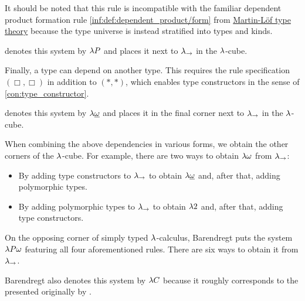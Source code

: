 \begin{definition}
\begin{thmenum}
    It should be noted that this rule is incompatible with the familiar dependent product formation rule \ref{inf:def:dependent_product/form} from \hyperref[def:mltt]{Martin-L\"of type theory} because the type universe is instead stratified into types and kinds.

     denotes this system by \( {\mathrm \lambda} P \) and places it next to \( {\mathrm \lambda}_{\rightarrow} \) in the \( {\mathrm \lambda} \)-cube.

     Finally, a type can depend on another type. This requires the rule specification \( (\Box, \Box) \) in addition to \( (\ast, \ast) \), which enables type constructors in the sense of \cref{con:type_constructor}.

     denotes this system by \( {\mathrm \lambda} \underline \omega \) and places it in the final corner next to \( {\mathrm \lambda}_{\rightarrow} \) in the \( {\mathrm \lambda} \)-cube.

     When combining the above dependencies in various forms, we obtain the other corners of the \( {\mathrm \lambda} \)-cube. For example, there are two ways to obtain \( {\mathrm \lambda} \omega \) from \( {\mathrm \lambda}_{\rightarrow} \):
    \begin{itemize}
      \item By adding type constructors to \( {\mathrm \lambda}_{\rightarrow} \) to obtain \( {\mathrm \lambda} \underline \omega \) and, after that, adding polymorphic types.

      \item By adding polymorphic types to \( {\mathrm \lambda}_{\rightarrow} \) to obtain \( {\mathrm \lambda} 2 \) and, after that, adding type constructors.
    \end{itemize}

    On the opposing corner of simply typed \( {\mathrm \lambda} \)-calculus, Barendregt puts the system \( {\mathrm \lambda} P \omega \) featuring all four aforementioned rules. There are six ways to obtain it from \( {\mathrm \lambda}_{\rightarrow} \).

    Barendregt also denotes this system by \( {\mathrm \lambda} C \) because it roughly corresponds to the  presented originally by .
  \end{thmenum}
\end{definition}

